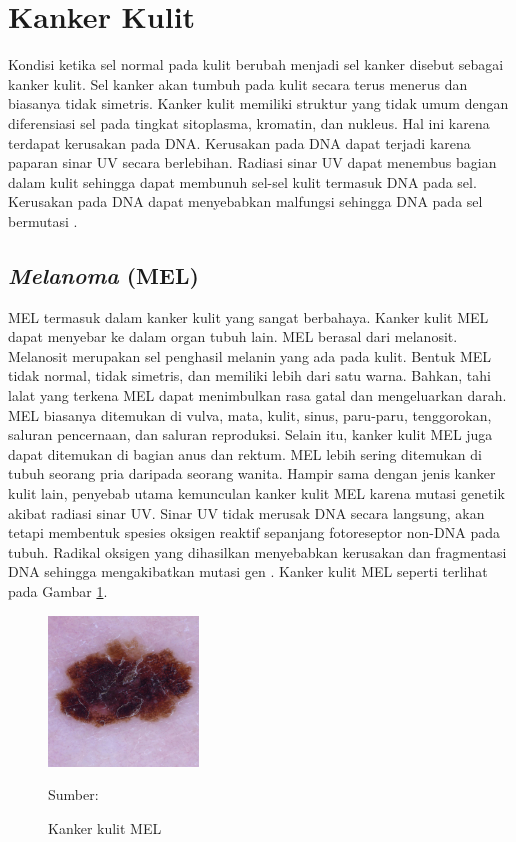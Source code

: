 \section{Kanker Kulit}
Kondisi ketika sel normal pada kulit berubah menjadi sel kanker disebut sebagai kanker kulit. Sel kanker akan tumbuh pada kulit secara terus menerus dan biasanya tidak simetris. Kanker kulit memiliki struktur yang tidak umum dengan diferensiasi sel pada tingkat sitoplasma, kromatin, dan nukleus. Hal ini karena terdapat kerusakan pada DNA. Kerusakan pada DNA dapat terjadi karena paparan sinar UV secara berlebihan. Radiasi sinar UV dapat menembus bagian dalam kulit sehingga dapat membunuh sel-sel kulit termasuk DNA pada sel. Kerusakan pada DNA dapat menyebabkan malfungsi sehingga DNA pada sel bermutasi \citep{Nugroho2019}.

    \subsection{\textit{Melanoma} (MEL)}
    MEL termasuk dalam kanker kulit yang sangat berbahaya. Kanker kulit MEL dapat menyebar ke dalam organ tubuh lain. MEL berasal dari melanosit. Melanosit merupakan sel penghasil melanin yang ada pada kulit. Bentuk MEL tidak normal, tidak simetris, dan memiliki lebih dari satu warna. Bahkan, tahi lalat yang terkena MEL dapat menimbulkan rasa gatal dan mengeluarkan darah. MEL biasanya ditemukan di vulva, mata, kulit, sinus, paru-paru, tenggorokan, saluran pencernaan, dan saluran reproduksi. Selain itu, kanker kulit MEL juga dapat ditemukan di bagian anus dan rektum. MEL lebih sering ditemukan di tubuh seorang pria daripada seorang wanita. Hampir sama dengan jenis kanker kulit lain, penyebab utama kemunculan kanker kulit MEL karena mutasi genetik akibat radiasi sinar UV. Sinar UV tidak merusak DNA secara langsung, akan tetapi membentuk spesies oksigen reaktif sepanjang fotoreseptor non-DNA pada tubuh. Radikal oksigen yang dihasilkan menyebabkan kerusakan dan fragmentasi DNA sehingga mengakibatkan mutasi gen \citep{Sang2019}. Kanker kulit MEL seperti terlihat pada Gambar \ref{fig:mel}.
    \begin{figure}[H] 
        \begin{center} 
            \includegraphics[width=4cm]{img/bab2/mel.jpg}
            \caption{Kanker kulit MEL} 
            \label{fig:mel}
            Sumber: \citep{Codella2018,Combalia2019,Tschandl2018}
        \end{center} 
    \end{figure}

